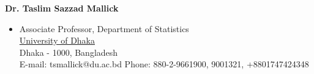\documentclass[10pt]{article}
\newenvironment{innerlist}[1][\enskip\textbullet]%
	{\begin{itemize}[#1,leftmargin=*,parsep=0pt,itemsep=0pt,topsep=0pt,partopsep=0pt]}
		{\end{itemize}}
\newcommand{\halfblankline}{\quad\vspace{-0.5\baselineskip}\pagebreak[3]}
\begin{document}
\halfblankline

{\bf Dr. Taslim Sazzad Mallick}
\begin{innerlist}
	\item[] Associate Professor, {Department of Statistics} \\
	\href{http://www.du.ac.bd/} {University of Dhaka}\\
	Dhaka - 1000, Bangladesh \\
    E-mail: tsmallick@du.ac.bd  \hfill {Phone: 880-2-9661900, 9001321, +8801747424348}
\end{innerlist}
\end{document}
